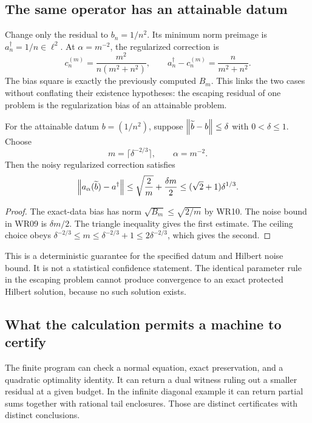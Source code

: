 
\subsection{The same operator has an attainable datum}
Change only the residual to $b_n=1/n^2$. Its minimum norm preimage is $a^\dagger_n=1/n\in\ell^2$. At $\alpha=m^{-2}$, the regularized correction is
\[
 c^{(m)}_n=\frac{m^2}{n(m^2+n^2)},\qquad
 a^\dagger_n-c^{(m)}_n=\frac{n}{m^2+n^2}.
\]
The bias square is exactly the previously computed $B_m$. This links the two cases without conflating their existence hypotheses: the escaping residual of one problem is the regularization bias of an attainable problem.

\begin{corollary}\label{WR12}
For the attainable datum $b=(1/n^2)$, suppose $\left\lVert\widetilde b-b\right\rVert\le\delta$ with $0<\delta\le1$. Choose
\[
 m=\lceil\delta^{-2/3}\rceil,\qquad\alpha=m^{-2}.
\]
Then the noisy regularized correction satisfies
\[
 \left\lVert a_\alpha(\widetilde b)-a^\dagger\right\rVert
 \le\sqrt{\frac2m}+\frac{\delta m}{2}
 \le(\sqrt2+1)\delta^{1/3}.
\]
\end{corollary}
\begin{proof}
The exact-data bias has norm $\sqrt{B_m}\le\sqrt{2/m}$ by WR10. The noise bound in WR09 is $\delta m/2$. The triangle inequality gives the first estimate. The ceiling choice obeys
$\delta^{-2/3}\le m\le\delta^{-2/3}+1\le2\delta^{-2/3}$, which gives the second.
\end{proof}

This is a deterministic guarantee for the specified datum and Hilbert noise bound. It is not a statistical confidence statement. The identical parameter rule in the escaping problem cannot produce convergence to an exact protected Hilbert solution, because no such solution exists.

\subsection{What the calculation permits a machine to certify}
The finite program can check a normal equation, exact preservation, and a quadratic optimality identity. It can return a dual witness ruling out a smaller residual at a given budget. In the infinite diagonal example it can return partial sums together with rational tail enclosures. Those are distinct certificates with distinct conclusions.

